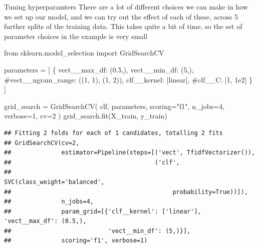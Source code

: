 \documentclass[
  10pt,
  ignorenonframetext,
  aspectratio=169]{beamer}
\newenvironment{Shaded}{\begin{snugshade}}{\end{snugshade}}
\newcommand{\CommentTok}[1]{\textcolor[rgb]{0.50,0.62,0.50}{#1}}
\newcommand{\DecValTok}[1]{\textcolor[rgb]{0.86,0.86,0.80}{#1}}
\newcommand{\FloatTok}[1]{\textcolor[rgb]{0.75,0.75,0.82}{#1}}
\newcommand{\ImportTok}[1]{\textcolor[rgb]{0.80,0.80,0.80}{#1}}
\newcommand{\NormalTok}[1]{\textcolor[rgb]{0.80,0.80,0.80}{#1}}
\newcommand{\OperatorTok}[1]{\textcolor[rgb]{0.94,0.94,0.82}{#1}}
\newcommand{\StringTok}[1]{\textcolor[rgb]{0.80,0.58,0.58}{#1}}
\begin{document}
\begin{frame}[fragile]{Tuning hyperparamters}
\protect\hypertarget{tuning-hyperparamters}{}
There are a lot of different choices we can make in how we set up our
model, and we can try out the effect of each of these, across 5 further
splits of the training data. This takes quite a bit of time, so the set
of parameter choices in the example is very small

\medskip
\scriptsize

\begin{Shaded}
\begin{Highlighting}[]
\ImportTok{from}\NormalTok{ sklearn.model\_selection }\ImportTok{import}\NormalTok{ GridSearchCV}

\NormalTok{parameters }\OperatorTok{=}\NormalTok{ [}
\NormalTok{    \{}
        \StringTok{\textquotesingle{}vect\_\_max\_df\textquotesingle{}}\NormalTok{: (}\FloatTok{0.5}\NormalTok{,),}
        \StringTok{\textquotesingle{}vect\_\_min\_df\textquotesingle{}}\NormalTok{: (}\DecValTok{5}\NormalTok{,),}
        \CommentTok{\#\textquotesingle{}vect\_\_ngram\_range\textquotesingle{}: ((1, 1), (1, 2)),  }
        \StringTok{\textquotesingle{}clf\_\_kernel\textquotesingle{}}\NormalTok{: [}\StringTok{\textquotesingle{}linear\textquotesingle{}}\NormalTok{], }
        \CommentTok{\#\textquotesingle{}clf\_\_C\textquotesingle{}: [1, 1e2]}
\NormalTok{    \}}
\NormalTok{]}

\NormalTok{grid\_search }\OperatorTok{=}\NormalTok{ GridSearchCV(}
\NormalTok{  clf, parameters, scoring}\OperatorTok{=}\StringTok{"f1"}\NormalTok{, n\_jobs}\OperatorTok{=}\DecValTok{4}\NormalTok{, verbose}\OperatorTok{=}\DecValTok{1}\NormalTok{, cv}\OperatorTok{=}\DecValTok{2}
\NormalTok{)}
\NormalTok{grid\_search.fit(X\_train, y\_train)}
\end{Highlighting}
\end{Shaded}

\begin{verbatim}
## Fitting 2 folds for each of 1 candidates, totalling 2 fits
## GridSearchCV(cv=2,
##              estimator=Pipeline(steps=[('vect', TfidfVectorizer()),
##                                        ('clf',
##                                         SVC(class_weight='balanced',
##                                             probability=True))]),
##              n_jobs=4,
##              param_grid=[{'clf__kernel': ['linear'], 'vect__max_df': (0.5,),
##                           'vect__min_df': (5,)}],
##              scoring='f1', verbose=1)
\end{verbatim}
\end{frame}
\end{document}
